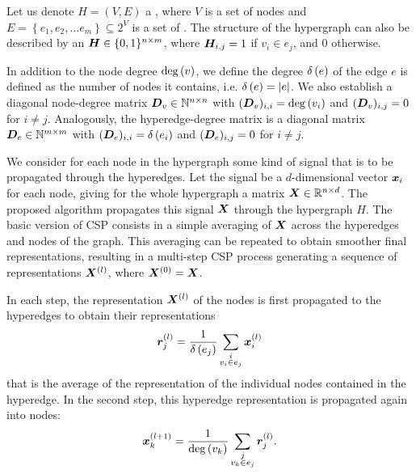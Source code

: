 Let us denote \( H = \left( V, E \right) \) a , where \( V \) is a set of nodes and \( E = \left\{ e_1, e_2, \dots e_m \right\} \subseteq 2^V \) is a set of . The structure of the hypergraph can also be described by an  \( \bm{H} \in \{ 0, 1 \}^{n \times m}\), where \( \bm{H}_{i, j} = 1 \) if \( v_i \in e_j \), and \( 0 \) otherwise.

In addition to the node degree \( \mathrm{deg} \left( v \right) \), we define the degree \( \delta \left( e \right) \) of the edge \( e \) is defined as the number of nodes it contains, i.e. \( \delta \left( e \right) = \left\lvert e \right\rvert \). We also establish a diagonal node-degree matrix \( \bm{D}_v \in \mathbb{N}^{n \times n} \) with \( (\bm{D}_v)_{i,i} = \mathrm{deg} \left( v_i \right) \) and \( (\bm{D}_v)_{i,j} = 0 \) for \( i \neq j \). Analogously, the hyperedge-degree matrix is a diagonal matrix \( \bm{D}_e \in \mathbb{N}^{m \times m} \) with \( (\bm{D}_e)_{i,i} = \delta \left( e_i \right) \) and \( (\bm{D}_e)_{i,j} = 0 \) for \( i \neq j \).

We consider for each node in the hypergraph some kind of signal that is to be propagated through the hyperedges. Let the signal be a \( d \)-dimensional vector \( \bm{x}_i \) for each node, giving for the whole hypergraph a matrix \( \bm{X} \in \mathbb{R}^{n \times d} \). The proposed algorithm propagates this signal $\bm{X}$ through the hypergraph $H$. The basic version of CSP consists in a simple averaging of \( \bm{X} \) across the hyperedges and nodes of the graph. This averaging can be repeated to obtain smoother final representations, resulting in a multi-step CSP process generating a sequence of representations \( \bm{X}^{(l)} \), where \( \bm{X}^{(0)} = \bm{X} \).

In each step, the representation $\bm{X}^{(l)}$ of the nodes is first propagated to the hyperedges to obtain their representations 
\begin{equation}\label{eq:CSP-edge-score}
\bm{r}_j^{(l)}=\frac{1}{\delta \left( e_j \right)}\sum_{\substack{i \\ v_i\in e_j}} \bm{x}_i^{(l)} 
\end{equation}
that is the average of the representation of the individual nodes contained in the hyperedge. In the second step, this hyperedge representation is propagated again into nodes:
\begin{equation}\label{eq:CSP-node-score}
\bm{x}_k^{(l+1)}=\frac{1}{\mathrm{deg} \left( v_k \right)}\sum_{\substack{j \\ v_k \in e_j}} \bm{r}_j^{(l)}.
\end{equation}

